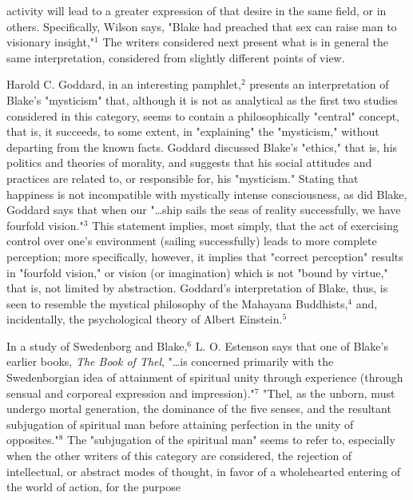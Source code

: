 \noindent activity will lead to a greater expression of that desire in the same field, or
in others. Specifically, Wilson says, "Blake had preached that sex can raise man to visionary insight,"$^{1}$ The writers
considered next present what is in general the same interpretation, considered
from slightly different points of view.\par
\vspace*{0.5\baselineskip}
Harold C. Goddard, in an interesting pamphlet,$^{2}$ presents an interpretation of
Blake's "mysticism" that, although it is not as analytical as the first two studies considered
in this category, seems to contain a philosophically "central" concept,
that is, it succeeds, to some extent, in "explaining" the "mysticism," without departing from
the known facts. Goddard discussed Blake's "ethics," that is, his politics
and theories of morality, and suggests that his social attitudes and practices
are related to, or responsible for, his "mysticism." Stating that happiness is not incompatible
with mystically intense consciousness, as did Blake, Goddard says that when our "\dots ship
sails the seas of reality successfully, we have fourfold vision."$^{3}$ This statement implies,
most simply, that the act of exercising control over one's environment (sailing successfully) leads
to more complete perception; more specifically, however, it implies that
"correct perception" results in "fourfold vision," or vision (or imagination)
which is not "bound by virtue," that is, not limited by abstraction. Goddard's
interpretation of Blake, thus, is seen to resemble the mystical philosophy of
the Mahayana Buddhists,$^{4}$ and, incidentally, the psychological theory of
Albert Einstein.$^{5}$\par
\vspace*{0.5\baselineskip}
In a study of Swedenborg and Blake,$^{6}$ L. O. Estenson says that one of Blake's earlier books,
\textit{The Book of Thel}, "\dots is concerned primarily with the Swedenborgian idea of attainment of
spiritual unity through experience (through sensual and corporeal expression and impression)."$^{7}$ "Thel,
as the unborn, must undergo mortal generation, the dominance of the five senses, and the resultant
subjugation of spiritual man before attaining perfection in the unity of opposites."$^{8}$
The "subjugation of the spiritual man" seems to refer to, especially when the other
writers of this category are considered, the rejection of intellectual, or abstract modes of
thought, in favor of a wholehearted entering of the world of action, for the purpose
